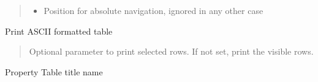 \documentclass[letterpaper,10pt,english]{sphinxmanual}
\begin{document}
\begin{savenotes}
\begin{fulllineitems}
\begin{savenotes}
\begin{fulllineitems}
\begin{quote}
\begin{description}
\begin{itemize}
\item {} 
\sphinxAtStartPar
{} \textendash{} Position for absolute navigation, ignored in any other case

\end{itemize}

\end{description}\end{quote}

\end{fulllineitems}\end{savenotes}


\begin{savenotes}\begin{fulllineitems}
\label{\detokenize{eezz:eezz.table.TTable.print}}
\pysigstartsignatures
{}
\pysigstopsignatures
\sphinxAtStartPar
Print ASCII formatted table
\begin{quote}\begin{description}
\sphinxAtStartPar
{} \textendash{} Optional parameter to print selected rows. If not set, print the visible rows.

\end{description}\end{quote}

\end{fulllineitems}\end{savenotes}


\begin{savenotes}\begin{fulllineitems}
\label{\detokenize{eezz:eezz.table.TTable.title}}
\pysigstartsignatures
{}
\pysigstopsignatures
\sphinxAtStartPar
Property \sphinxhyphen{} Table title name

\end{fulllineitems}\end{savenotes}


\end{fulllineitems}\end{savenotes}
\end{document}
